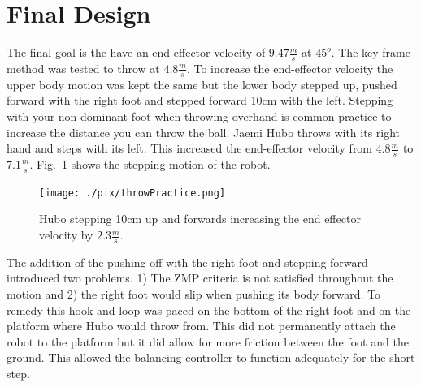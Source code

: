 \section{Final Design}\label{sec:finalDesign}

The final goal is the have an end-effector velocity of $9.47\frac{m}{s}$ at $45^o$.  
The key-frame method was tested to throw at $4.8\frac{m}{s}$.  
To increase the end-effector velocity the upper body motion was kept the same but the lower body stepped up, pushed forward with the right foot and stepped forward 10cm with the left.  
Stepping with your non-dominant foot when throwing overhand is common practice to increase the distance you can throw the ball.  
Jaemi Hubo throws with its right hand and steps with its left.  
This increased the end-effector velocity from $4.8\frac{m}{s}$ to $7.1\frac{m}{s}$.
Fig.~\ref{fig:hubo-step} shows the stepping motion of the robot.

\begin{figure}[t]
  \centering
\texttt{[image: ./pix/throwPractice.png]}
  \caption{Hubo stepping 10cm up and forwards increasing the end effector velocity by $2.3\frac{m}{s}$.}
  \label{fig:hubo-step}
\end{figure}

The addition of the pushing off with the right foot and stepping forward introduced two problems.  1) The ZMP criteria is not satisfied throughout the motion and 2) the right foot would slip when pushing its body forward.  
To remedy this hook and loop was paced on the bottom of the right foot and on the platform where Hubo would throw from.  
This did not permanently attach the robot to the platform but it did allow for more friction between the foot and the ground.
This allowed the balancing controller to function adequately for the short step.

